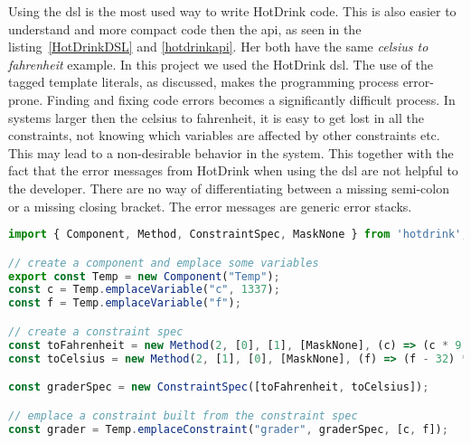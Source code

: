 Using the \gls{dsl} is the most used way to write HotDrink code. This is also easier to 
understand and more compact code then the \gls{api}, as seen in the listing~\ref{HotDrinkDSL} 
and \ref{hotdrinkapi}. Her both have the same \textit{celsius to fahrenheit} example. In 
this project we used the HotDrink \gls{dsl}. The use of the tagged template literals, as 
discussed, makes the programming process error-prone. 
Finding and fixing code errors becomes a significantly difficult process. In systems 
larger then the celsius to fahrenheit, it is easy to get lost in all the constraints, 
not knowing which variables are affected by other constraints etc. This may lead to a 
non-desirable behavior in the system.
This together with the fact that the error messages from HotDrink when using 
the \gls{dsl} are not helpful to the developer. There are no way of differentiating 
between a missing semi-colon or a missing closing bracket. The error messages are 
generic error stacks. 

\begin{lstlisting}[caption={Example of how to use the HotDrink \gls{api} to simulate the relationship between fahrenheit and celsius},label=hotdrinkapi, language=JavaScript]
import { Component, Method, ConstraintSpec, MaskNone } from 'hotdrink';

// create a component and emplace some variables
export const Temp = new Component("Temp");
const c = Temp.emplaceVariable("c", 1337);
const f = Temp.emplaceVariable("f");

// create a constraint spec
const toFahrenheit = new Method(2, [0], [1], [MaskNone], (c) => (c * 9 / 5 + 32));
const toCelsius = new Method(2, [1], [0], [MaskNone], (f) => (f - 32) * 5 / 9);

const graderSpec = new ConstraintSpec([toFahrenheit, toCelsius]);

// emplace a constraint built from the constraint spec
const grader = Temp.emplaceConstraint("grader", graderSpec, [c, f]);
\end{lstlisting}
